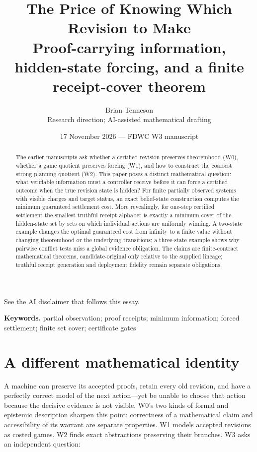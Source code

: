 \documentclass[11pt,letterpaper]{article}
\theoremstyle{definition}
\theoremstyle{remark}
\begin{document}
\newcommand{\leveltag}{W3}
\title{\bfseries\LARGE The Price of Knowing Which Revision to Make\\[0.45em]\large Proof-carrying information, hidden-state forcing, and a finite receipt-cover theorem}
\author{Brian Tenneson\\\normalsize Research direction; AI-assisted mathematical drafting}
\date{17 November 2026 --- FDWC W3 manuscript}
\maketitle
\begin{center}\small See the AI disclaimer that follows this essay.\end{center}
\begin{abstract}The earlier manuscripts ask whether a certified revision preserves theoremhood (W0), whether a game quotient preserves forcing (W1), and how to construct the coarsest strong planning quotient (W2). This paper poses a distinct mathematical question: what verifiable information must a controller receive before it can force a certified outcome when the true revision state is hidden? For finite partially observed systems with visible charges and target status, an exact belief-state construction computes the minimum guaranteed settlement cost. More revealingly, for one-step certified settlement the smallest truthful receipt alphabet is exactly a minimum cover of the hidden-state set by sets on which individual actions are uniformly winning. A two-state example changes the optimal guaranteed cost from infinity to a finite value without changing theoremhood or the underlying transitions; a three-state example shows why pairwise conflict tests miss a global evidence obligation. The claims are finite-contract mathematical theorems, candidate-original only relative to the supplied lineage; truthful receipt generation and deployment fidelity remain separate obligations.\end{abstract}
\noindent\textbf{Keywords.} partial observation; proof receipts; minimum information; forced settlement; finite set cover; certificate gates
\tableofcontents
\newpage

\section{A different mathematical identity}
A machine can preserve its accepted proofs, retain every old revision, and have a perfectly correct model of the next action---yet be unable to choose that action because the decisive evidence is not visible. W0's two kinds of formal and epistemic description sharpen this point: correctness of a mathematical claim and accessibility of its warrant are separate properties. W1 models accepted revisions as costed games. W2 finds exact abstractions preserving their branches. W3 asks an independent question:
\end{document}
